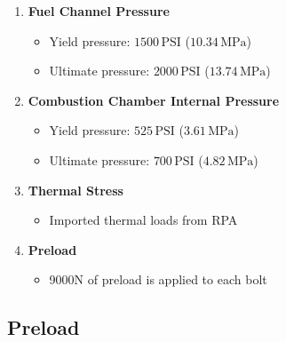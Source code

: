 \begin{enumerate}
    \item \textbf{Fuel Channel Pressure}
    \begin{itemize}
        \item Yield pressure: $1500\,\text{PSI}$ ($10.34\,\text{MPa}$)
        \item Ultimate pressure: $2000\,\text{PSI}$ ($13.74\,\text{MPa}$)
    \end{itemize}
    
    \item \textbf{Combustion Chamber Internal Pressure}
    \begin{itemize}
        \item Yield pressure: $525\,\text{PSI}$ ($3.61\,\text{MPa}$)
        \item Ultimate pressure: $700\,\text{PSI}$ ($4.82\,\text{MPa}$)
    \end{itemize}

    \item \textbf{Thermal Stress}
    \begin{itemize}
        \item Imported thermal loads from RPA 
    \end{itemize}
    \item \textbf{Preload}
    \begin{itemize}
        \item 9000N of preload is applied to each bolt
    \end{itemize}
\end{enumerate}


\subsection{Preload}

